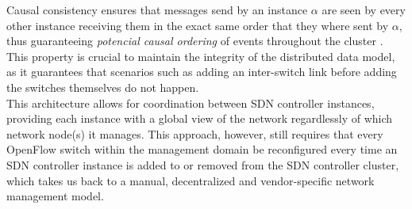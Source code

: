 Causal consistency ensures that messages send by an instance $\alpha$ are seen by every other instance receiving them in the exact same order that they where sent by $\alpha$, thus guaranteeing \emph{potencial causal ordering} of events throughout the cluster \cite{PADI}.
This property is crucial to maintain the integrity of the distributed data model, as it guarantees that scenarios such as adding an inter-switch link before adding the switches themselves do not happen.\\
%
This architecture allows for coordination between \gls{SDN} controller instances, providing each instance with a global view of the network regardlessly of which network node(s) it manages.
This approach, however, still requires that every OpenFlow switch within the management domain be reconfigured every time an \gls{SDN} controller instance is added to or removed from the \gls{SDN} controller cluster, which takes us back to a manual, decentralized and vendor-specific network management model.\\
%

